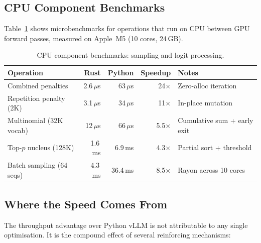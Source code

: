 \documentclass[11pt,a4paper]{article}
\newcommand{\thead}[1]{\textbf{#1}}
\begin{document}
\subsection{CPU Component Benchmarks}

Table~\ref{tab:cpu_bench} shows microbenchmarks for operations that run on CPU
between GPU forward passes, measured on Apple~M5 (10 cores, 24\,GB).

\begin{table}[t]
  \centering
  \caption{CPU component benchmarks: sampling and logit processing.}
  \label{tab:cpu_bench}
  \small
  \begin{tabular}{@{}lrrrp{3.2cm}@{}}
    \toprule
    \rowcolor{HeaderBlue} \thead{Operation} & \thead{Rust} & \thead{Python} & \thead{Speedup} & \thead{Notes} \\
    \midrule
    Combined penalties      & 2.6\,$\mu$s  & 63\,$\mu$s  & 24$\times$  & Zero-alloc iteration \\
    \rowcolor{gray!8}
    Repetition penalty (2K) & 3.1\,$\mu$s  & 34\,$\mu$s  & 11$\times$  & In-place mutation \\
    Multinomial (32K vocab)  & 12\,$\mu$s   & 66\,$\mu$s  & 5.5$\times$ & Cumulative sum + early exit \\
    \rowcolor{gray!8}
    Top-$p$ nucleus (128K)  & 1.6\,ms      & 6.9\,ms     & 4.3$\times$ & Partial sort + threshold \\
    Batch sampling (64 seqs) & 4.3\,ms     & 36.4\,ms    & 8.5$\times$ & Rayon across 10 cores \\
    \bottomrule
  \end{tabular}
\end{table}

\subsection{Where the Speed Comes From}

The throughput advantage over Python vLLM is not attributable to any
single optimisation. It is the compound effect of several reinforcing mechanisms:
\end{document}
